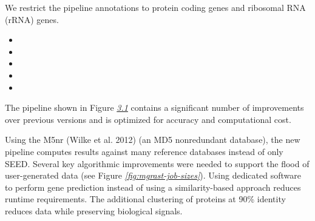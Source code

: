 \documentclass[letterpaper,10pt,english]{sphinxmanual}
\begin{document}
We restrict the pipeline annotations to protein coding genes and
ribosomal RNA (rRNA) genes.
\begin{itemize}
\item {} 

\item {} 

\item {} 

\item {} 

\item {} 

\end{itemize}

The pipeline shown in Figure {\hyperref[\detokenize{user_manual:fig:mgrast-v3-pipeline}]{\emph{3.1}}} contains
a significant number of improvements over previous versions and is
optimized for accuracy and computational cost.

Using the M5nr (Wilke et al. 2012) (an MD5 nonredundant database), the
new pipeline computes results against many reference databases instead
of only SEED. Several key algorithmic improvements were needed to
support the flood of user-generated data (see Figure
{\hyperref[\detokenize{user_manual:fig:mgrast-job-sizes}]{\emph{{[}fig:mgrast-job-sizes{]}}}}). Using dedicated
software to perform gene prediction instead of using a similarity-based
approach reduces runtime requirements. The additional clustering of
proteins at 90\% identity reduces data while preserving biological
signals.
\end{document}
